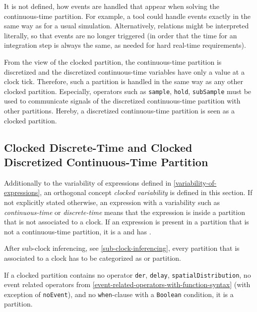 \begin{nonnormative}
It is not defined, how events are handled that appear when solving the continuous-time partition. For example, a tool could handle events exactly in the same way as for a usual
simulation.  Alternatively, relations might be interpreted literally, so that events are no longer triggered (in order that the time for an integration step is always the same,
as needed for hard real-time requirements).
\end{nonnormative}

From the view of the clocked partition, the continuous-time
partition is discretized and the discretized continuous-time variables
have only a value at a clock tick. Therefore, such a partition is
handled in the same way as any other clocked partition. Especially,
operators such as \lstinline!sample!, \lstinline!hold!, \lstinline!subSample! must be used to communicate
signals of the discretized continuous-time partition with other
partitions. Hereby, a discretized continuous-time partition is seen as a
clocked partition.


\subsection{Clocked Discrete-Time and Clocked Discretized Continuous-Time Partition}\label{clocked-discrete-time-and-clocked-discretized-continuous-time-partition}

Additionally to the variability of expressions defined in \cref{variability-of-expressions},
an orthogonal concept \emph{clocked variability} is defined in this
section. If not explicitly stated otherwise, an expression with a
variability such as \emph{continuous-time} or \emph{discrete-time} means that
the expression is inside a partition that is not associated to a clock.
If an expression is present in a partition that is not a continuous-time
partition, it is a  and has
.

After sub-clock inferencing, see \cref{sub-clock-inferencing}, every partition that is
associated to a clock has to be categorized as  or 
partition.

If a clocked partition contains no operator \lstinline!der!,
\lstinline!delay!, \lstinline!spatialDistribution!, no event related operators
from \cref{event-related-operators-with-function-syntax} (with exception of \lstinline!noEvent!), and no
\lstinline!when!-clause with a \lstinline!Boolean! condition, it is a  partition.

